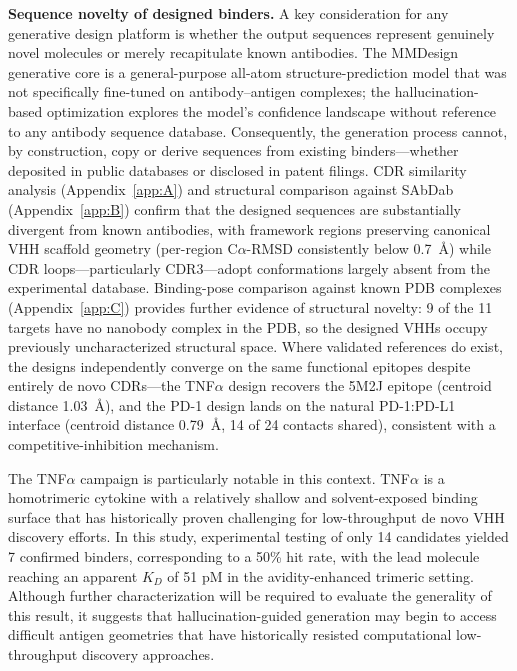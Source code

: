 \documentclass[11pt]{article}
\begin{document}
\textbf{Sequence novelty of designed binders.} A key consideration for any generative design platform
is whether the output sequences represent genuinely novel molecules or merely recapitulate known
antibodies. The MMDesign generative core is a general-purpose all-atom structure-prediction
model that was not specifically fine-tuned on antibody--antigen complexes; the hallucination-based
optimization explores the model's confidence landscape without reference to any antibody sequence
database. Consequently, the generation process cannot, by construction, copy or derive sequences
from existing binders---whether deposited in public databases or disclosed in patent filings. CDR
similarity analysis (Appendix~\ref{app:A}) and structural comparison against SAbDab (Appendix~\ref{app:B}) confirm
that the designed sequences are substantially divergent from known antibodies, with framework regions preserving canonical VHH scaffold geometry (per-region C$\alpha$-RMSD consistently below 0.7~\AA{})
while CDR loops---particularly CDR3---adopt conformations largely absent from the experimental
database. Binding-pose comparison against known PDB complexes (Appendix~\ref{app:C}) provides further
evidence of structural novelty: 9 of the 11 targets have no nanobody complex in the PDB, so the
designed VHHs occupy previously uncharacterized structural space. Where validated references
do exist, the designs independently converge on the same functional epitopes despite entirely de
novo CDRs---the TNF$\alpha$ design recovers the 5M2J epitope (centroid distance 1.03~\AA{}), and the PD-1
design lands on the natural PD-1:PD-L1 interface (centroid distance 0.79~\AA{}, 14 of 24 contacts shared),
consistent with a competitive-inhibition mechanism.

The TNF$\alpha$ campaign is particularly notable in this context. TNF$\alpha$ is a homotrimeric cytokine with
a relatively shallow and solvent-exposed binding surface that has historically proven challenging for
low-throughput de novo VHH discovery efforts. In this study, experimental testing of only 14 candidates yielded 7 confirmed binders, corresponding to a 50\% hit rate, with the lead molecule reaching
an apparent $K_D$ of 51 pM in the avidity-enhanced trimeric setting. Although further characterization
will be required to evaluate the generality of this result, it suggests that hallucination-guided generation may begin to access difficult antigen geometries that have historically resisted computational
low-throughput discovery approaches.
\end{document}
